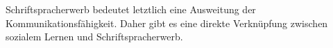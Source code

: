 Schriftspracherwerb bedeutet letztlich eine Ausweitung der Kommunikationsfähigkeit.
Daher gibt es eine direkte Verknüpfung zwischen sozialem Lernen und Schriftspracherwerb.
